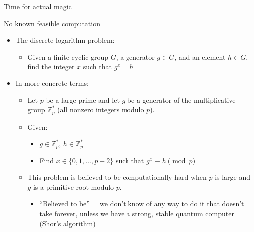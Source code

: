 \documentclass[aspectratio=169, lualatex, handout]{beamer}
\begin{document}
\begin{frame}{Time for actual magic}
\end{frame}

\begin{frame}{No known feasible computation}
	\begin{itemize}[<+->]
		\item The discrete logarithm problem:
		      \begin{itemize}
			      \item Given a finite cyclic group $G$, a generator $g \in G$, and an element
			            $h \in G$, find the integer $x$ such that $g^{x}=h$
		      \end{itemize}
		\item In more concrete terms:
		      \begin{itemize}
			      \item Let $p$ be a large prime and let $g$ be a generator of the multiplicative
			            group $\mathbb{Z}_{p}^{*}$ (all nonzero integers modulo $p$).

			      \item Given:
			            \begin{itemize}
				            \item $g \in \mathbb{Z}_{p}^{*}$, $h \in \mathbb{Z}_{p}^{*}$

				            \item Find $x \in \{0, 1, \ldots, p-2\}$ such that $g^{x} \equiv h \pmod
					                  {p}$
			            \end{itemize}

			      \item This problem is believed to be computationally hard when $p$ is large
			            and $g$ is a primitive root modulo $p$.
			            \begin{itemize}
				            \item ``Believed to be'' = we don't know of any way to do it that doesn't
				                  take forever, unless we have a strong, stable quantum computer (Shor's
				                  algorithm)
			            \end{itemize}
		      \end{itemize}
	\end{itemize}
\end{frame}
\end{document}
